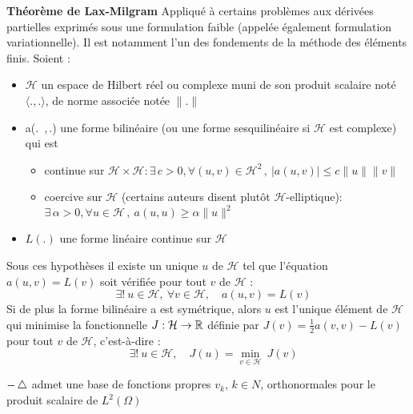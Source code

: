 \textbf{Th\'eor\`eme de Lax-Milgram}\newline
Appliqu\'e \`a certains probl\`emes aux d\'eriv\'ees partielles exprim\'es sous une formulation faible (appel\'ee \'egalement formulation variationnelle).
Il est notamment l'un des fondements de la m\'ethode des \'el\'ements finis.
Soient :
\begin{itemize}
\item $\mathcal{H}$ un espace de Hilbert r\'eel ou complexe muni de son produit scalaire not\'e $\langle.,.\rangle$, de norme associ\'ee not\'ee $\|.\|$
\item a(.\, ,\,.) une forme bilin\'eaire (ou une forme sesquilin\'eaire si $\mathcal{H}$ est complexe) qui est
	\begin{itemize}
	\item continue sur $\mathcal{H}\times\mathcal{H} : \exists\,c>0, \forall (u,v)\in \mathcal{H}^2\,,\ |a(u,v)|\leq c\|u\|\|v\|$
	\item coercive sur $\mathcal{H}$ (certains auteurs disent plut\^ot $\mathcal{H}$-elliptique):
		$\exists\,\alpha>0, \forall u\in\mathcal{H}\,,\ a(u,u) \geq \alpha\|u\|^2$
	\end{itemize}
\item $L(.)$ une forme lin\'eaire continue sur $\mathcal{H}$
\end{itemize}
Sous ces hypoth\`eses il existe un unique $u$ de $\mathcal{H}$ tel que l'\'equation $a(u,v)=L(v)$ soit v\'erifi\'ee pour tout $v$ de $\mathcal{H}$ :
$$
\quad \exists!\ u \in \mathcal{H},\ \forall v\in\mathcal{H},\quad a(u,v)=L(v)
$$
Si de plus la forme bilin\'eaire a est sym\'etrique, alors $u$ est l'unique \'el\'ement de $\mathcal{H}$ qui
minimise la fonctionnelle $J:\mathcal{H}\rightarrow\mathbb{R}$ d\'efinie par $J(v) = \tfrac{1}{2}a(v,v)-L(v)$ pour tout $v$ de $\mathcal{H}$, c'est-\`a-dire :
$$
\quad \exists!\ u \in \mathcal{H},\quad J(u) = \min_{v\in\mathcal{H}}\ J(v)
$$
\bigskip

$-\mathop{}\!\mathbin\bigtriangleup $ admet une base de fonctions propres $v_k$, $k \in N$,
orthonormales pour le produit scalaire de $L^2(\Omega)$


